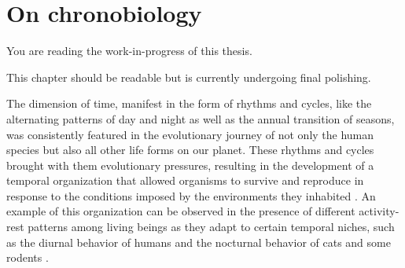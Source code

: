 \documentclass[
12pt,
openright,
oneside,
a4paper,
chapter=TITLE,
section=TITLE,
french,
spanish,
brazil,
english
]{abntex2}\usepackage{array}
\newcommand{\microskip}{\vspace{\microskipamount}}
\begin{document}

\chapter{On chronobiology}\label{on-chronobiology}

\begin{tcolorbox}[enhanced jigsaw, opacitybacktitle=0.6, titlerule=0mm, coltitle=black, bottomtitle=1mm, breakable, rightrule=.15mm, left=2mm, title=\textcolor{quarto-callout-note-color}{\faInfo}\hspace{0.5em}{Note}, opacityback=0, colbacktitle=quarto-callout-note-color!10!white, toprule=.15mm, toptitle=1mm, leftrule=.75mm, colback=white, bottomrule=.15mm, arc=.35mm, colframe=quarto-callout-note-color-frame]

You are reading the work-in-progress of this thesis.

\microskip

This chapter should be readable but is currently undergoing final
polishing.

\end{tcolorbox}

The dimension of time, manifest in the form of rhythms and cycles, like
the alternating patterns of day and night as well as the annual
transition of seasons, was consistently featured in the evolutionary
journey of not only the human species but also all other life forms on
our planet. These rhythms and cycles brought with them evolutionary
pressures, resulting in the development of a temporal organization that
allowed organisms to survive and reproduce in response to the conditions
imposed by the environments they inhabited
\autocite{pittendrigh1981,menna-barreto2003}. An example of this
organization can be observed in the presence of different activity-rest
patterns among living beings as they adapt to certain temporal niches,
such as the diurnal behavior of humans and the nocturnal behavior of
cats and some rodents \autocite{foster2005}.
\end{document}
